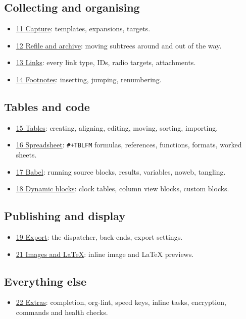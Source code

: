 \subsection{Collecting and organising}
\label{sec:orgb4ec9e4}
\begin{itemize}
\item \href{11-capture.org}{11 Capture}: templates, expansions, targets.
\item \href{12-refile-archive.org}{12 Refile and archive}: moving subtrees around and out of the way.
\item \href{13-links.org}{13 Links}: every link type, IDs, radio targets, attachments.
\item \href{14-footnotes.org}{14 Footnotes}: inserting, jumping, renumbering.
\end{itemize}
\subsection{Tables and code}
\label{sec:orga368926}
\begin{itemize}
\item \href{15-tables.org}{15 Tables}: creating, aligning, editing, moving, sorting, importing.
\item \href{16-spreadsheet.org}{16 Spreadsheet}: \texttt{\#+TBLFM} formulas, references, functions, formats,
worked sheets.
\item \href{17-babel.org}{17 Babel}: running source blocks, results, variables, noweb, tangling.
\item \href{18-dynamic-blocks.org}{18 Dynamic blocks}: clock tables, column view blocks, custom blocks.
\end{itemize}
\subsection{Publishing and display}
\label{sec:orge87d85b}
\begin{itemize}
\item \href{19-export.org}{19 Export}: the dispatcher, back-ends, export settings.
\item \href{21-images-latex.org}{21 Images and \LaTeX{}}: inline image and \LaTeX{} previews.
\end{itemize}
\subsection{Everything else}
\label{sec:org6852f3b}
\begin{itemize}
\item \href{22-extras.org}{22 Extras}: completion, org-lint, speed keys, inline tasks, encryption,
commands and health checks.
\end{itemize}
